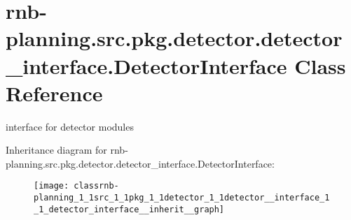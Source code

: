 \hypertarget{classrnb-planning_1_1src_1_1pkg_1_1detector_1_1detector__interface_1_1_detector_interface}{}\section{rnb-\/planning.src.\+pkg.\+detector.\+detector\+\_\+interface.\+Detector\+Interface Class Reference}
\label{classrnb-planning_1_1src_1_1pkg_1_1detector_1_1detector__interface_1_1_detector_interface}


interface for detector modules  




Inheritance diagram for rnb-\/planning.src.\+pkg.\+detector.\+detector\+\_\+interface.\+Detector\+Interface\+:\nopagebreak
\begin{figure}[H]
\begin{center}
\leavevmode
\texttt{[image: classrnb-planning\_1\_1src\_1\_1pkg\_1\_1detector\_1\_1detector\_\_interface\_1\_1\_detector\_interface\_\_inherit\_\_graph]}
\end{center}
\end{figure}
